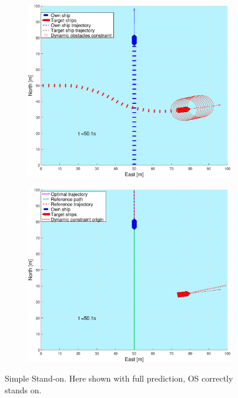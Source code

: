 \begin{figure}[ht!]
\begin{subfigure}[b]{0.499\textwidth}
        \subcaption{}
    \end{subfigure}
    \hfill
    \\
    \begin{subfigure}[b]{0.49\textwidth}
        \centering
        \includegraphics[width=\textwidth]{Images/Figures/enkel_SO/_Simple_0fig1_time=50}
        \subcaption{}
    \end{subfigure}
    \hfill
    \begin{subfigure}[b]{0.499\textwidth}
        \centering
        \includegraphics[width=\textwidth]{Images/Figures/enkel_SO/_Simple_0fig999_time=50}
        \subcaption{}
    \end{subfigure}
    \hfill
    \caption{Simple Stand-on. Here shown with full prediction, \gls{OS} correctly stands on.}
    \label{FIG: simple SO full pred}
\end{figure}%
